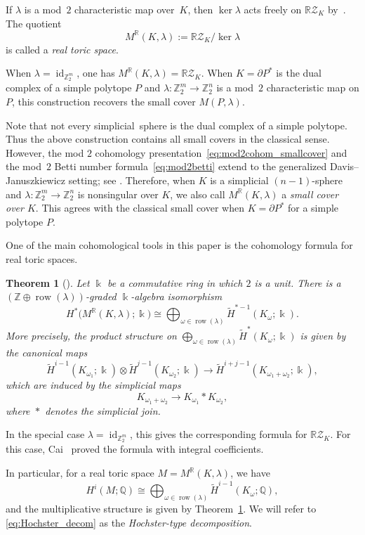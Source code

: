 \documentclass{amsart}
\newtheorem{theorem}{Theorem}[section]
\numberwithin{equation}{section}
\theoremstyle{definition}
\theoremstyle{remark}
\newcommand{\Z}{\mathbb Z}
\newcommand{\R}{\mathbb R}
\newcommand{\Q}{\mathbb Q}
\newcommand{\RZ}{\mathbb R\mathcal Z}
\newcommand{\field}{\Bbbk}
\DeclareMathOperator{\join}{\ast}
\DeclareMathOperator{\row}{row}
\DeclareMathOperator{\id}{id}
\begin{document}
If $\lambda$ is a mod~$2$ characteristic map over~$K$, then $\ker\lambda$ acts freely on $\RZ_K$ by~\cite{Choi-Kaji-Theriault2017}.
The quotient
$$
    M^\R(K,\lambda):=\RZ_K/\ker\lambda
$$
is called a \emph{real toric space}.

When $\lambda = \id_{\Z_2^m}$, one has $M^\R(K,\lambda)=\RZ_K$.
When $K=\partial P^\ast$ is the dual complex of a simple polytope $P$ and $\lambda\colon \Z_2^m\to \Z_2^n$ is a mod~$2$ characteristic map on $P$, this construction recovers the small cover $M(P,\lambda)$.

Note that not every simplicial~sphere is the dual complex of a simple polytope.
Thus the above construction contains all small covers in the classical sense.
However, the mod $2$ cohomology presentation~\eqref{eq:mod2cohom_smallcover} and the mod~$2$ Betti number formula~\eqref{eq:mod2betti} extend to the generalized Davis--Januszkiewicz setting; see \cite[Theorem~5.12]{Davis-Januszkiewicz1991}.
Therefore, when $K$ is a simplicial $(n-1)$-sphere and $\lambda\colon \Z_2^m\to \Z_2^n$ is nonsingular over $K$, we also call $M^\R(K,\lambda)$ a \emph{small cover over $K$}.
This agrees with the classical small cover when $K=\partial P^\ast$ for a simple polytope $P$.

One of the main cohomological tools in this paper is the cohomology formula for real toric spaces.
\begin{theorem}[{\cite{Choi-Park2020}}]\label{thm:CP}
    Let $\field$ be a commutative ring in which $2$ is a unit.
    There is a $(\Z\oplus \row(\lambda))$-graded $\field$-algebra isomorphism
    $$
        H^\ast\bigl(M^\R(K,\lambda);\field \bigr) \cong \bigoplus_{\omega\in \row(\lambda)} \widetilde H^{\ast-1}(K_\omega;\field).
    $$ 
    More precisely, the product structure on $\bigoplus_{\omega\in \row(\lambda)}\widetilde H^\ast(K_\omega;\field)$ is given by the canonical maps
    $$
        \widetilde H^{i-1}(K_{\omega_1};\field)\otimes \widetilde H^{j-1}(K_{\omega_2};\field) \to \widetilde H^{i+j-1}(K_{\omega_1+\omega_2};\field),
    $$
    which are induced by the simplicial maps
    $$
        K_{\omega_1+\omega_2}\to K_{\omega_1} \join K_{\omega_2},
    $$
    where $\join$ denotes the simplicial join.
\end{theorem}
In the special case $\lambda=\id_{\Z_2^m}$, this gives the corresponding formula for $\RZ_K$. 
For this case, Cai~\cite{Cai2017} proved the formula with integral coefficients.

In particular, for a real toric space $M=M^\R(K,\lambda)$, we have
\begin{equation} \label{eq:Hochster_decom}
    H^i(M;\Q) \cong \bigoplus_{\omega\in \row(\lambda)} \widetilde H^{i-1}(K_\omega;\Q),  
\end{equation}
and the multiplicative structure is given by Theorem~\ref{thm:CP}.
We will refer to \eqref{eq:Hochster_decom} as the \emph{Hochster-type decomposition}.
\end{document}
